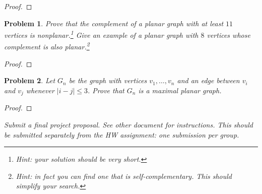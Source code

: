 \documentclass[11pt]{article}
\newtheorem{problem}{Problem}
\begin{document}
\begin{proof}

\end{proof}


\pagebreak

\begin{problem}
Prove that the complement of a planar graph with at least $11$ vertices is nonplanar.\footnote{Hint: your solution should be very short.} Give an example of a planar graph with $8$ vertices whose complement is also planar.\footnote{Hint: in fact you can find one that is self-complementary. This should simplify your search.}
\end{problem}

\begin{proof}

\end{proof}

\pagebreak

\begin{problem}
Let $G_n$ be the graph with vertices $v_1,\ldots,v_n$ and an edge between $v_i$ and $v_j$ whenever $|i-j|\le 3$. Prove that $G_n$ is a maximal planar graph.
\end{problem}

\begin{proof}

\end{proof}


\pagebreak

{\it Submit a final project proposal. See other document for instructions. This should be submitted separately from the HW assignment: one submission per group.}
\end{document}
